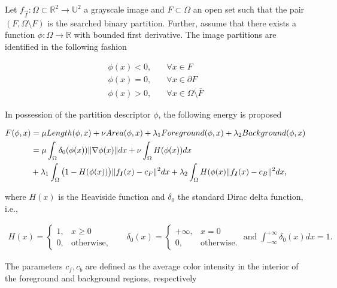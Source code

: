 	Let $f_{\vec{I}}:\Omega \subset \mathbb{R}^2 \rightarrow \mathbb{U}^2$ a grayscale image and $F \subset \Omega$ an open set such that the pair $(F,\Omega \setminus F)$ is the searched binary partition. Further, assume that there exists a function $\phi: \Omega \rightarrow \mathbb{R}$ with bounded first derivative. The image partitions are identified in the following fashion
	
\begin{align*}
	\phi(x) < 0,&\quad \forall x \in F \\
	\phi(x) = 0,&\quad \forall x \in \partial F\\
	\phi(x) > 0,&\quad \forall x \in \Omega \setminus \overline{F}
\end{align*}
	
	In possession of the partition descriptor $\phi$, the following energy is proposed	
	
\begin{align}
	F(\phi,x) &= \mu Length(\phi,x) + \nu Area(\phi,x) + \lambda_1 Foreground(\phi,x) + \lambda_2 Background(\phi,x) \nonumber \\	
	&= \mu \int_{\Omega}{\delta_0(\phi(x))\lVert \nabla \phi(x)\rVert dx} + \nu \int_{\Omega}{H(\phi(x))dx} \nonumber \\
	&+ \lambda_1 \int_{\Omega}{\big(1-H(\phi(x))\big)\lVert f_{\bm{I}}(x) - c_F\rVert^2dx} + \lambda_2\int_{\Omega}{H(\phi(x)\lVert f_{\bm{I}}(x)-c_B\rVert^2dx},
	\label{ch1:eq:chan-vese-functional}
\end{align}

where $H(x)$ is the Heaviside function and $\delta_0$ the standard Dirac delta function, i.e.,

\[
\begin{array}{ll}
	H(x) = \left\{ \begin{array}{ll}
		1, & x \geq 0 \\
		0, & \text{otherwise},
	\end{array}\right. & \quad 
	
	\delta_0( x ) = \left\{ \begin{array}{ll}
								+ \infty,& x=0\\
								0,& \text{otherwise}.
							\end{array}\right. \text{ and } \int_{-\infty}^{+\infty}{\delta_0(x)dx}=1.
	
\end{array}
\]

The parameters $c_f,c_b$ are defined as the average color intensity in the interior of the foreground and background regions, respectively

